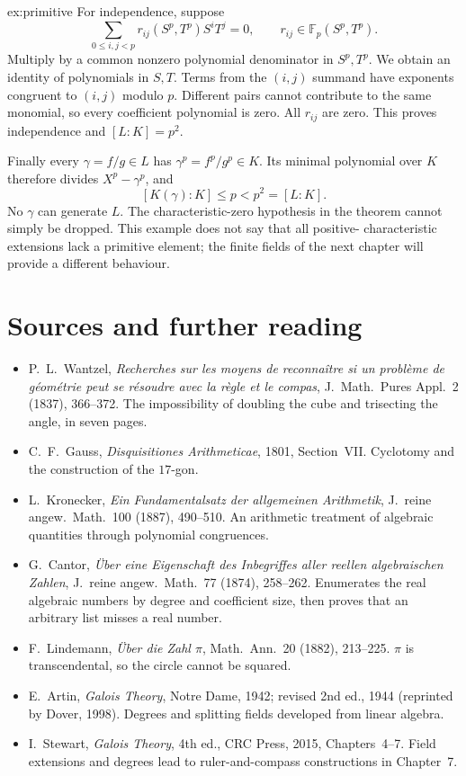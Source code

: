 \begin{solution}{ex:primitive}
For independence, suppose
\[
\sum_{0\le i,j<p}r_{ij}(S^p,T^p)S^iT^j=0,\qquad r_{ij}\in\mathbb F_p(S^p,T^p).
\]
Multiply by a common nonzero polynomial denominator in $S^p,T^p$. We obtain
an identity of polynomials in $S,T$. Terms from the $(i,j)$ summand have
exponents congruent to $(i,j)$ modulo $p$. Different pairs cannot contribute
to the same monomial, so every coefficient polynomial is zero. All $r_{ij}$
are zero. This proves independence and $[L:K]=p^2$.

Finally every $\gamma=f/g\in L$ has $\gamma^p=f^p/g^p\in K$. Its minimal
polynomial over $K$ therefore divides $X^p-\gamma^p$, and
\[
[K(\gamma):K]\le p<p^2=[L:K].
\]
No $\gamma$ can generate $L$. The characteristic-zero hypothesis in the theorem
cannot simply be dropped. This example does not say that all positive-
characteristic extensions lack a primitive element; the finite fields of the
next chapter will provide a different behaviour.
\end{solution}

\section*{Sources and further reading}

\begin{itemize}
\item P.~L.~Wantzel, \emph{Recherches sur les moyens de reconnaître si un problème de géométrie peut se résoudre avec la règle et le compas}, J.\ Math.\ Pures Appl.\ 2 (1837), 366--372. The impossibility of doubling the cube and trisecting the angle, in seven pages.
\item C.~F.~Gauss, \emph{Disquisitiones Arithmeticae}, 1801, Section~VII. Cyclotomy and the construction of the $17$-gon.
\item L.~Kronecker, \emph{Ein Fundamentalsatz der allgemeinen Arithmetik}, J.\ reine angew.\ Math.\ 100 (1887), 490--510. An arithmetic treatment of algebraic quantities through polynomial congruences.
\item G.~Cantor, \emph{Über eine Eigenschaft des Inbegriffes aller reellen algebraischen Zahlen}, J.\ reine angew.\ Math.\ 77 (1874), 258--262. Enumerates the real algebraic numbers by degree and coefficient size, then proves that an arbitrary list misses a real number.
\item F.~Lindemann, \emph{Über die Zahl $\pi$}, Math.\ Ann.\ 20 (1882), 213--225. $\pi$ is transcendental, so the circle cannot be squared.
\item E.~Artin, \emph{Galois Theory}, Notre Dame, 1942; revised 2nd ed., 1944 (reprinted by Dover, 1998). Degrees and splitting fields developed from linear algebra.
\item I.~Stewart, \emph{Galois Theory}, 4th ed., CRC Press, 2015, Chapters~4--7. Field extensions and degrees lead to ruler-and-compass constructions in Chapter~7.
\end{itemize}
